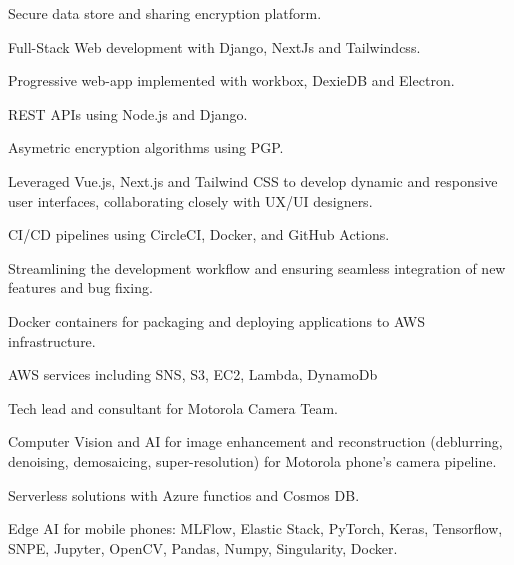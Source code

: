\documentclass[]{deedy-resume-reversed}
\begin{document}
\begin{minipage}[t]{0.6\textwidth}

\begin{tightemize}
\item Secure data store and sharing encryption platform.
\item Full-Stack Web development with Django, NextJs and Tailwindcss.
\item Progressive web-app implemented with workbox, DexieDB and Electron.
\item REST APIs using Node.js and Django.
\item Asymetric encryption algorithms using PGP.
\item Leveraged Vue.js, Next.js and Tailwind CSS to develop dynamic and responsive user interfaces, collaborating closely with UX/UI designers.
\item CI/CD pipelines using CircleCI, Docker, and GitHub Actions.
\item Streamlining the development workflow and ensuring seamless integration of new features and bug fixing.
\item Docker containers for packaging and deploying applications to AWS infrastructure.
\item AWS services including SNS, S3, EC2, Lambda, DynamoDb
\end{tightemize}
\sectionsep

\begin{tightemize}
\item Tech lead and consultant for Motorola Camera Team.
\item Computer Vision and AI for image enhancement and reconstruction (deblurring, denoising, demosaicing, super-resolution) for Motorola phone's camera pipeline. 
\item Serverless solutions with Azure functios and Cosmos DB.
\item Edge AI for mobile phones: MLFlow, Elastic Stack, PyTorch, Keras, Tensorflow, SNPE, Jupyter, OpenCV, Pandas, Numpy, Singularity, Docker.
\end{tightemize}
\sectionsep


\end{minipage}
\end{document}
